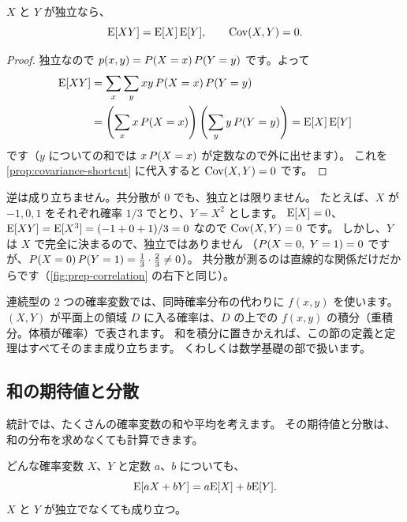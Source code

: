 \begin{theorem}
  $X$ と $Y$ が独立なら、
  \[
    \mathrm{E}[XY] = \mathrm{E}[X]\,\mathrm{E}[Y], \qquad \mathrm{Cov}(X, Y) = 0.
  \]
\end{theorem}

\begin{proof}
  独立なので $p(x, y) = P(X = x)\,P(Y = y)$ です。よって
  \begin{align*}
    \mathrm{E}[XY] &= \sum_{x} \sum_{y} x y\, P(X = x)\,P(Y = y) \\
    &= \left(\sum_{x} x\, P(X = x)\right) \left(\sum_{y} y\, P(Y = y)\right)
    = \mathrm{E}[X]\,\mathrm{E}[Y]
  \end{align*}
  です（$y$ についての和では $x\,P(X = x)$ が定数なので外に出せます）。
  これを\cref{prop:covariance-shortcut} に代入すると $\mathrm{Cov}(X, Y) = 0$ です。
\end{proof}

\begin{exampoint}
  逆は成り立ちません。共分散が $0$ でも、独立とは限りません。
  たとえば、$X$ が $-1, 0, 1$ をそれぞれ確率 $1/3$ でとり、$Y = X^2$ とします。
  $\mathrm{E}[X] = 0$、$\mathrm{E}[XY] = \mathrm{E}[X^3] = (-1 + 0 + 1)/3 = 0$ なので $\mathrm{Cov}(X, Y) = 0$ です。
  しかし、$Y$ は $X$ で完全に決まるので、独立ではありません
  （$P(X = 0,\ Y = 1) = 0$ ですが、$P(X = 0)\,P(Y = 1) = \frac13 \cdot \frac23 \neq 0$）。
  共分散が測るのは直線的な関係だけだからです（\cref{fig:prep-correlation} の右下と同じ）。
\end{exampoint}

\begin{supplement}[連続型の場合]
  連続型の 2 つの確率変数では、同時確率分布の代わりに $f(x, y)$ を使います。
  $(X, Y)$ が平面上の領域 $D$ に入る確率は、$D$ の上での $f(x, y)$ の積分（重積分。体積が確率）で表されます。
  和を積分に置きかえれば、この節の定義と定理はすべてそのまま成り立ちます。
  くわしくは数学基礎の部で扱います。
\end{supplement}

\subsection{和の期待値と分散}

統計では、たくさんの確率変数の和や平均を考えます。
その期待値と分散は、和の分布を求めなくても計算できます。

\begin{theorem}
  どんな確率変数 $X$、$Y$ と定数 $a$、$b$ についても、
  \[
    \mathrm{E}[aX + bY] = a\mathrm{E}[X] + b\mathrm{E}[Y].
  \]
  $X$ と $Y$ が独立でなくても成り立つ。
\end{theorem}

